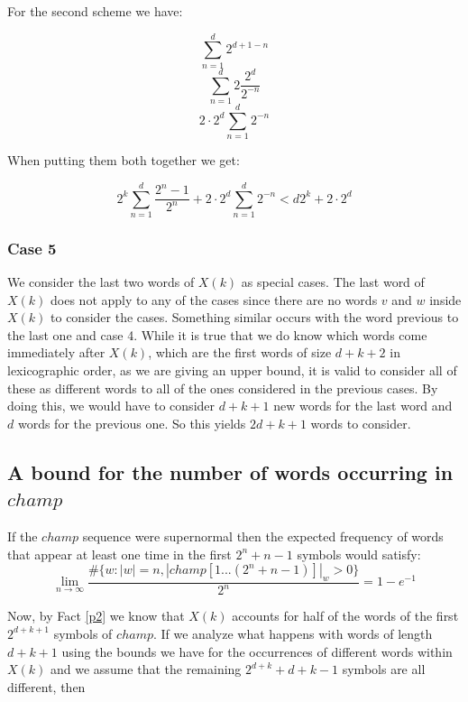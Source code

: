 \documentclass[11pt,a4paper]{tesis}
\newcommand{\note}[1]{\textbf{\color{red}{#1}}}
\begin{document}
For the second scheme we have:

$$ \sum_{n=1}^{d} 2^{d + 1 - n}$$
$$ \sum_{n=1}^{d} 2 \frac{2^d}{2^{- n}}$$
$$ 2 \cdot 2^d \sum_{n=1}^{d} 2^{- n}$$

When putting them both together we get:

$$  2^k \sum_{n=1}^{d} \frac{2^n - 1}{2^n}  + 2 \cdot 2^d \sum_{n=1}^{d} 2^{- n} < d2^k + 2 \cdot 2^d$$

\subsubsection{Case 5}

We consider the last two words of $X(k)$ as special cases. The last word of $X(k)$ does not apply to any of the cases since there are no words $v$ and $w$ inside $X(k)$ to consider the cases. Something similar occurs with the word previous to the last one and case 4. 
While it is true that we do know which words come immediately after  $X(k)$, which are the first words of size $d+k+2$ in lexicographic order, as we are giving an upper bound, it is valid to consider all of these as different words to all of the ones considered in the previous cases.
By doing this, we would have to consider $d+k+1$ new words for the last word and $d$ words for the previous one. So this yields $2d+k+1$ words to consider.


\subsection{A bound for the number of words occurring in $champ$}%

If the $champ$ %
 sequence were supernormal then the expected frequency of words that appear at least one time in the first $2^n + n -1$ symbols would satisfy:
$$\lim_{n\to\infty} \frac{\#\{w: |w| = n  , |champ[1...(2^n+n-1)]|_w > 0\}}{2^n}  = 1 - e^{-1}$$


Now, by Fact \ref{p2} we know that $X(k)$ accounts for half of the words of the first $2^{d+k+1}$ symbols of $champ$. 
If we analyze what happens with words of length $d+k+1$ using the bounds we have for the occurrences of different words within $X(k)$ and we assume that the remaining $2^{d+k} + d + k - 1$  symbols are all different, then
\end{document}
